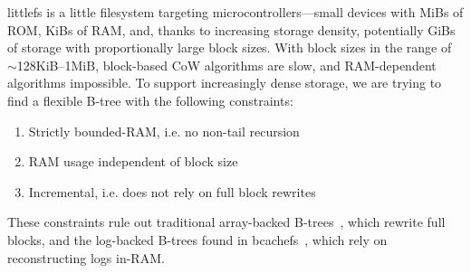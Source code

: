 \documentclass[letterpaper,twocolumn,10pt]{article}
\def\lfs+{littlefs}
\begin{document}
\lfs+ is a little filesystem targeting microcontrollers---small devices with
MiBs of ROM, KiBs of RAM, and, thanks to
increasing storage density, potentially GiBs of storage with
proportionally large block sizes.
With block sizes in the range of {$\sim$}128KiB--1MiB,
block-based CoW algorithms are slow, and
RAM-dependent algorithms impossible.
To support increasingly dense storage, we are trying to find a flexible
B-tree with the following constraints:
\begin{enumerate}
\item Strictly bounded-RAM, i.e. no non-tail recursion
\item RAM usage independent of block size
\item Incremental, i.e. does not rely on full block rewrites
\end{enumerate}
These constraints rule out traditional array-backed
B-trees~\cite{ubiquitous-btree}, which rewrite full blocks,
and
the log-backed B-trees found in bcachefs~\cite{bcachefs}, which rely on
reconstructing logs in-RAM.
\end{document}
